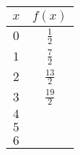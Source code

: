 \begin{tabular}{cc} \toprule
$x$  & $f(x)$         \\\midrule
$0$  & $\frac{1}{2}$  \\[6pt]
$1$  & $\frac{7}{2}$  \\[6pt]
$2$  & $\frac{13}{2}$ \\[6pt]
$3$  & $\frac{19}{2}$ \\[6pt]
$4$  &                \\[6pt]
$5$  &                \\[6pt]
$6$  &                \\\bottomrule
\end{tabular}
